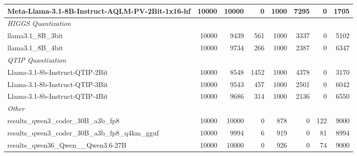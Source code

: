 \begin{table}[htbp]
{\begin{tabular}{lrrrrrrr}
    \midrule
    Meta-Llama-3.1-8B-Instruct-AQLM-PV-2Bit-1x16-hf & 10000 & 10000 & 0 & 1000 & 7295 & 0 & 1705 \\
    \midrule
    \multicolumn{8}{l}{\textit{HIGGS Quantization}} \\
    \midrule
    llama3.1\_8B\_3bit & 10000 & 9439 & 561 & 1000 & 3337 & 0 & 5102 \\
    llama3.1\_8B\_4bit & 10000 & 9734 & 266 & 1000 & 2387 & 0 & 6347 \\
    \midrule
    \multicolumn{8}{l}{\textit{QTIP Quantization}} \\
    \midrule
    Llama-3.1-8b-Instruct-QTIP-2Bit & 10000 & 8548 & 1452 & 1000 & 4378 & 0 & 3170 \\
    Llama-3.1-8b-Instruct-QTIP-3Bit & 10000 & 9543 & 457 & 1000 & 2501 & 0 & 6042 \\
    Llama-3.1-8b-Instruct-QTIP-4Bit & 10000 & 9686 & 314 & 1000 & 2136 & 0 & 6550 \\
    \midrule
    \multicolumn{8}{l}{\textit{Other}} \\
    \midrule
    results\_qwen3\_coder\_30B\_a3b\_fp8 & 10000 & 10000 & 0 & 878 & 0 & 122 & 9000 \\
    results\_qwen3\_coder\_30B\_a3b\_fp8\_q4km\_gguf & 10000 & 9994 & 6 & 919 & 0 & 81 & 8994 \\
    results\_qwen36\_Qwen\_\_Qwen3.6-27B & 10000 & 10000 & 0 & 926 & 0 & 74 & 9000 \\
    \bottomrule
  \end{tabular}
  }
\end{table}

